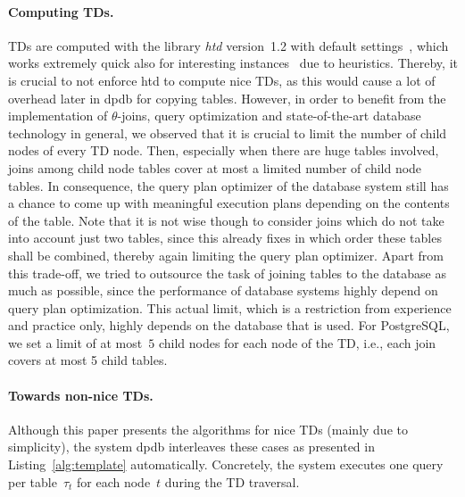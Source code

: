 \documentclass{llncs}
\newcommand{\dpdb}{{\small\textsf{dpdb}}\xspace}
\newcommand{\tab}[1]{\ensuremath{\tau_{#1}}}
\begin{document}
\paragraph*{Computing TDs.}
TDs are computed with the library \emph{htd} version~1.2 with default
settings~\cite{AbseherMusliuWoltran17a}, which works extremely quick
also for interesting instances~\cite{FichteHecherZisser19} due to heuristics.
Thereby, it is crucial to not enforce htd to compute nice TDs, as this would cause a lot of overhead later in \dpdb for copying tables.
However, in order to benefit from the implementation of $\theta$-joins,
query optimization and state-of-the-art database technology in general, 
we observed that it is crucial to limit the number of child nodes of every TD node.
Then, especially when there are huge tables involved, joins among child node tables
cover at most a limited number of child node tables.
In consequence, the query plan optimizer of the database system still has a chance
to come up with meaningful execution plans depending on the contents of the table.
Note that it is not wise though to consider joins which do not take into account just two tables,
since this already fixes in which order these tables shall be combined,
thereby again limiting the query plan optimizer.
Apart from this trade-off, we tried to outsource the task of joining tables to the database as much as possible, since the performance of database systems highly depend on query plan optimization. %
This actual limit, which is a restriction from experience and practice only, highly depends on the database that is used.
For PostgreSQL, we set a limit of at most~$5$ child nodes for each node of the TD,
i.e., each join covers at most 5 child tables.

\paragraph*{Towards non-nice TDs.}
Although this paper presents the algorithms for nice TDs (mainly due to simplicity),
the system \dpdb interleaves these cases as presented in 
Listing~\ref{alg:template} automatically.
Concretely, the system executes one query per table~$\tab{t}$ for each node~$t$ during the TD traversal.

\end{document}
